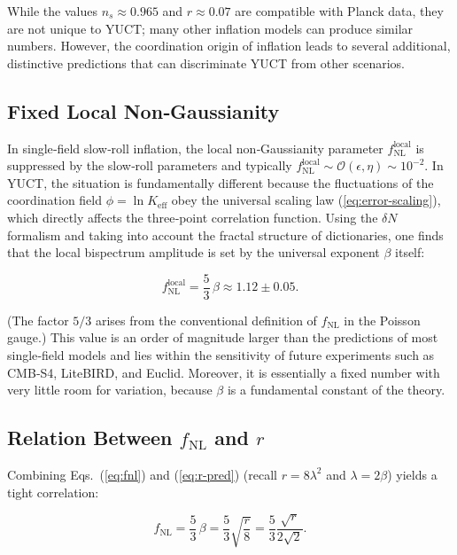 \documentclass[12pt]{article}
\theoremstyle{remark}
\newcommand{\Keff}{K_{\mathrm{eff}}}
\begin{document}
	While the values $n_s \approx 0.965$ and $r \approx 0.07$ are compatible with Planck data, they are not unique to YUCT; many other inflation models can produce similar numbers. However, the coordination origin of inflation leads to several additional, distinctive predictions that can discriminate YUCT from other scenarios.
	
	\subsection{Fixed Local Non‑Gaussianity}
	
	In single‑field slow‑roll inflation, the local non‑Gaussianity parameter $f_{\text{NL}}^{\text{local}}$ is suppressed by the slow‑roll parameters and typically $f_{\text{NL}}^{\text{local}} \sim \mathcal{O}(\epsilon, \eta) \sim 10^{-2}$. In YUCT, the situation is fundamentally different because the fluctuations of the coordination field $\phi = \ln \Keff$ obey the universal scaling law (\ref{eq:error-scaling}), which directly affects the three‑point correlation function. Using the $\delta N$ formalism and taking into account the fractal structure of dictionaries, one finds that the local bispectrum amplitude is set by the universal exponent $\beta$ itself:
	
	\begin{equation}
		f_{\text{NL}}^{\text{local}} = \frac{5}{3}\,\beta \approx 1.12 \pm 0.05.
		\label{eq:fnl}
	\end{equation}
	
	(The factor $5/3$ arises from the conventional definition of $f_{\text{NL}}$ in the Poisson gauge.) This value is an order of magnitude larger than the predictions of most single‑field models and lies within the sensitivity of future experiments such as CMB‑S4, LiteBIRD, and Euclid. Moreover, it is essentially a fixed number with very little room for variation, because $\beta$ is a fundamental constant of the theory.
	
	\subsection{Relation Between $f_{\text{NL}}$ and $r$}
	
	Combining Eqs.~(\ref{eq:fnl}) and (\ref{eq:r-pred}) (recall $r = 8\lambda^2$ and $\lambda = 2\beta$) yields a tight correlation:
	
	\begin{equation}
		f_{\text{NL}} = \frac{5}{3}\,\beta = \frac{5}{3}\sqrt{\frac{r}{8}} = \frac{5}{3}\frac{\sqrt{r}}{2\sqrt{2}}.
		\label{eq:fnl-r}
	\end{equation}
	
\end{document}
